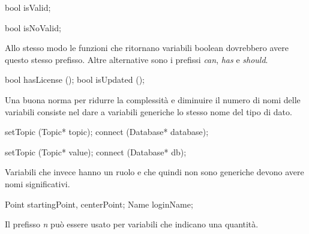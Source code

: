 \begin{minipage}[t]{\cbwidth}
\begin{RightCode}
bool isValid;
\end{RightCode}
\end{minipage}%
\hspace{\cbdistance}
\begin{minipage}[t]{\cbwidth}
\begin{ErrorCode}
bool isNoValid;
\end{ErrorCode}
\end{minipage}

Allo stesso modo le funzioni che ritornano variabili boolean dovrebbero avere questo stesso prefisso.
Altre alternative sono i prefissi \emph{can}, \emph{has} e \emph{should}.

\begin{minipage}[t]{\rbwidth}
\begin{RightCode}
bool hasLicense ();
bool isUpdated ();
\end{RightCode}
\end{minipage}

Una buona norma per ridurre la complessità e diminuire il numero di nomi delle variabili consiste nel dare a variabili generiche lo stesso nome del tipo di dato.

\begin{minipage}[t]{\cbwidth}
\begin{RightCode}
setTopic (Topic* topic);
connect (Database* database);
\end{RightCode}
\end{minipage}%
\hspace{\cbdistance}
\begin{minipage}[t]{\cbwidth}
\begin{ErrorCode}
setTopic (Topic* value);
connect (Database* db);
\end{ErrorCode}
\end{minipage}

Variabili che invece hanno un ruolo e che quindi non sono generiche devono avere nomi significativi.

\begin{minipage}[t]{\rbwidth}
\begin{RightCode}
Point startingPoint, centerPoint;
Name loginName;
\end{RightCode}
\end{minipage}%


Il prefisso \emph{n} può essere usato per variabili che indicano una quantità.

